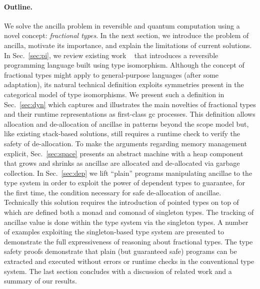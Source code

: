 \documentclass[sigplan,10pt,review,anonymous]{acmart}
\begin{document}
\paragraph*{Outline.} We solve the ancilla problem in reversible and
quantum computation using a novel concept: \emph{fractional types}. In
the next section, we introduce the problem of ancilla, motivate its
importance, and explain the limitations of current solutions. In
Sec.~\ref{sec:pi}, we review existing work%
~\cite{rc2011,DBLP:conf/esop/CaretteS16,rc2012,James:2012:IE:2103656.2103667}
that introduces a reversible programming language built using type
isomorphism.  Although the concept of fractional types might apply to
general-purpose languages (after some adaptation), its natural
technical definition exploits symmetries present in the categorical
model of type isomorphisms. We present such a definition in
Sec.~\ref{sec:dyn} which captures and illustrates the main novelties
of fractional types and their runtime representations as first-class
gc processes. This definition allows allocation and de-allocation of
ancillae in patterns beyond the scope model but, like existing
stack-based solutions, still requires a runtime check to verify the
safety of de-allocation.
To make the arguments regarding memory
management explicit, Sec.~\ref{sec:space} presents an abstract machine
with a heap component that grows and shrinks as ancillae are allocated
and de-allocated via garbage collection. In Sec.~\ref{sec:dep} we
lift ``plain'' programs manipulating ancillae to the type system in
order to exploit the power of dependent types to guarantee, for the
first time, the condition necessary for safe de-allocation of
ancillae. Technically this solution requires the introduction of
pointed types on top of which are defined both a monad and comonad of
singleton types. The tracking of ancillae value is done within the
type system via the singleton types. A number of examples exploiting
the singleton-based type system are presented to demonstrate the full
expressiveness of reasoning about fractional types. The type safety proofs demonstrate
that plain (but guaranteed safe)
programs can be extracted and executed without errors or runtime
checks in the conventional type system. The last section concludes
with a discussion of related work and a summary of our results.
\end{document}
